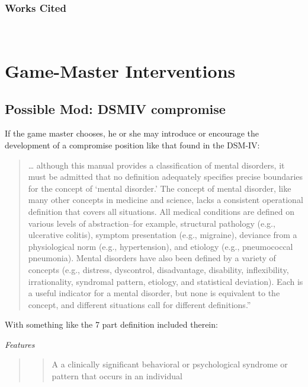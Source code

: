 \begin{refsection}
\subsubsection{Works Cited}
\label{workscited}

~\citep{Travers:1969dw}
~\citep{Bernard:1978vt}

\section{Game-Master Interventions}
\label{game-masterinterventions}

\subsection{Possible Mod: DSMIV compromise}
\label{possiblemod:dsmivcompromise}

If the game master chooses, he or she may introduce or encourage the development of a compromise position like that found in the DSM-IV: 

\begin{quote}

… although this manual provides a classification of mental disorders, it must be admitted that no definition adequately specifies precise boundaries for the concept of ‘mental disorder.’ The concept of mental disorder, like many other concepts in medicine and science, lacks a consistent operational definition that covers all situations. All medical conditions are defined on various levels of abstraction--for example, structural pathology (e.g., ulcerative colitis), symptom presentation (e.g., migraine), deviance from a physiological norm (e.g., hypertension), and etiology (e.g., pneumococcal pneumonia). Mental disorders have also been defined by a variety of concepts (e.g., distress, dyscontrol, disadvantage, disability, inflexibility, irrationality, syndromal pattern, etiology, and statistical deviation). Each is a useful indicator for a mental disorder, but none is equivalent to the concept, and different situations call for different definitions.” 
\end{quote}

With something like the 7 part definition included therein:

\emph{Features}

\begin{quote}

\begin{quote}

A a clinically significant behavioral or psychological syndrome or pattern that occurs in an individual


\end{quote}
\end{quote}
\end{refsection}
